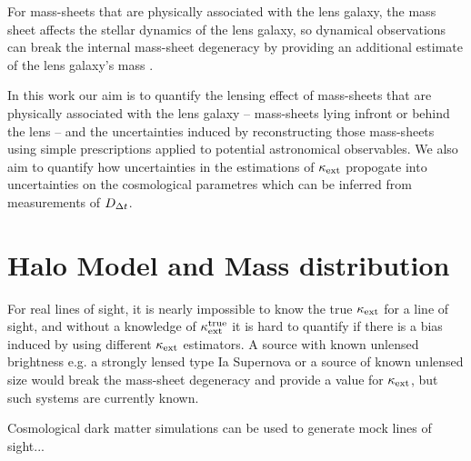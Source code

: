 \documentclass[useAMS,usenatbib]{mn2e}
\begin{document}
For mass-sheets that are physically associated with the lens galaxy, the mass sheet
 affects the stellar dynamics of the
lens galaxy, so dynamical observations can break the internal
mass-sheet degeneracy by providing an additional estimate of the lens galaxy's mass
\citep[e.g.,][]{GroginNarayan96a, GroginNarayan96b, TonryFranx99, KoopmansTreu02,
 TreuKoopmans02, BarnabeKoopmans07, suyu2010}. 

In this work our aim is to quantify the lensing effect of mass-sheets that are physically associated with the lens galaxy -- mass-sheets
lying infront or behind the lens -- and the uncertainties induced by reconstructing
those mass-sheets using simple prescriptions applied to potential astronomical observables.
We also aim to quantify how uncertainties in the
estimations of $\kappa_{\rm ext}$ propogate into uncertainties on the cosmological parametres
which can be inferred from measurements of $D_{\Delta t}$.



\section{Halo Model and Mass distribution}
\label{sec:model}

For real lines of sight, it is nearly impossible to know the true $\kappa_{\rm ext}$ for a
line of sight, and without a knowledge of $\kappa_{\rm ext}^{\mathrm{true}}$ it is hard to
quantify if there is a bias induced by using different $\kappa_{\rm ext}$ estimators.
A source with known unlensed brightness e.g. a strongly lensed type Ia
Supernova  or a source of known unlensed size 
would break the mass-sheet degeneracy and provide a value for $\kappa_{\rm ext}$, but
 such systems are currently known.

Cosmological dark matter simulations can be used to generate mock lines of sight...
\end{document}
